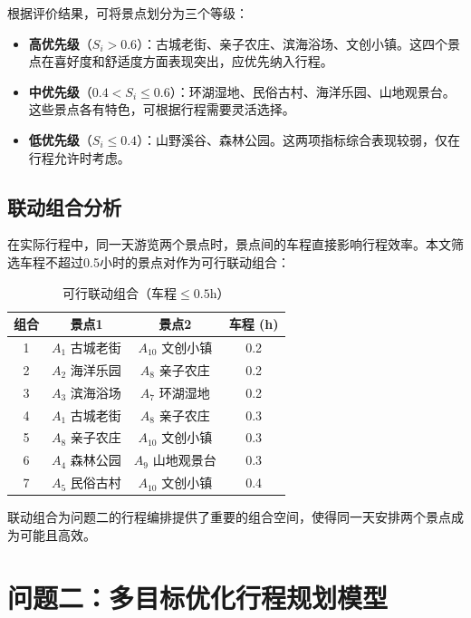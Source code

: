 \documentclass[12pt,a4paper]{ctexart}
\begin{document}
根据评价结果，可将景点划分为三个等级：

\begin{itemize}
    \item \textbf{高优先级}（$S_i > 0.6$）：古城老街、亲子农庄、滨海浴场、文创小镇。这四个景点在喜好度和舒适度方面表现突出，应优先纳入行程。
    \item \textbf{中优先级}（$0.4 < S_i \le 0.6$）：环湖湿地、民俗古村、海洋乐园、山地观景台。这些景点各有特色，可根据行程需要灵活选择。
    \item \textbf{低优先级}（$S_i \le 0.4$）：山野溪谷、森林公园。这两项指标综合表现较弱，仅在行程允许时考虑。
\end{itemize}

\subsection{联动组合分析}

在实际行程中，同一天游览两个景点时，景点间的车程直接影响行程效率。本文筛选车程不超过0.5小时的景点对作为可行联动组合：

\begin{table}[H]
\centering
\caption{可行联动组合（车程$\le 0.5$h）}
\label{tab:combo}
\begin{tabular}{cccc}
\toprule
\textbf{组合} & \textbf{景点1} & \textbf{景点2} & \textbf{车程 (h)} \\
\midrule
1 & $A_1$ 古城老街 & $A_{10}$ 文创小镇 & 0.2 \\
2 & $A_2$ 海洋乐园 & $A_8$ 亲子农庄 & 0.2 \\
3 & $A_3$ 滨海浴场 & $A_7$ 环湖湿地 & 0.2 \\
4 & $A_1$ 古城老街 & $A_8$ 亲子农庄 & 0.3 \\
5 & $A_8$ 亲子农庄 & $A_{10}$ 文创小镇 & 0.3 \\
6 & $A_4$ 森林公园 & $A_9$ 山地观景台 & 0.3 \\
7 & $A_5$ 民俗古村 & $A_{10}$ 文创小镇 & 0.4 \\
\bottomrule
\end{tabular}
\end{table}

联动组合为问题二的行程编排提供了重要的组合空间，使得同一天安排两个景点成为可能且高效。

\section{问题二：多目标优化行程规划模型}
\end{document}
